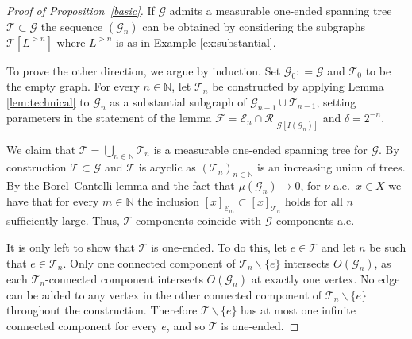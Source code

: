 \documentclass[letterpaper,11pt,reqno]{amsart}
\theoremstyle{bfnote}
\theoremstyle{definition}
\newtheorem{remark}[theorem]{Remark}
\newcommand{\0}{\varnothing}
\numberwithin{equation}{section}
\begin{document}
\begin{proof}[Proof of Proposition~\ref{basic}]
If $\mathcal{G}$ admits a measurable one-ended spanning tree $\mathcal{T} \subset \mathcal{G}$ the sequence $(\mathcal G_n)$ can be obtained by considering the subgraphs $\mathcal T[L^{>n}]$ where $L^{>n}$ is as in Example \ref{ex:substantial}.

To prove the other direction, we argue by induction. Set $\mathcal G_0: = \mathcal G$ and $\mathcal T_0 $ to be the empty graph. For every $n\in \mathbb N$, let $\mathcal T_n$ be constructed by applying Lemma \ref{lem:technical} to $\mathcal G_{n}$ as a substantial subgraph of $\mathcal G_{n-1} \cup \mathcal T_{n-1}$, setting parameters in the statement of the lemma $\mathcal F = \mathcal E_{n} \cap \mathcal{R}|_{\mathcal G[I(\mathcal G_{n})]}$ and $\delta = 2^{-n}$.


We claim that $\mathcal T = \bigcup_{n\in \mathbb N} \mathcal T_n$ is a measurable one-ended spanning tree for $\mathcal G$. By construction $\mathcal T \subset \mathcal G$ and $\mathcal T$ is acyclic as $(\mathcal T_{n})_{n\in \mathbb N}$ is an increasing union of trees. By the Borel--Cantelli lemma and the fact that $\mu (\mathcal G_n) \to 0$, for $\nu$-a.e.\ $x\in X$ we have that for every $m\in \mathbb N$ the inclusion $[x]_{\mathcal E_m} \subset [x]_{\mathcal T_n}$ holds for all $n$ sufficiently large. Thus, $\mathcal T$-components coincide with $\mathcal G$-components a.e. 

It is only left to show that $\mathcal T$ is one-ended. To do this, let $e \in \mathcal T$ and let $n$ be such that $e \in \mathcal T_n$. Only one connected component of $\mathcal T_n \backslash \{e\}$ intersects $O(\mathcal G_n)$, as each $\mathcal T_n$-connected component intersects $O(\mathcal G_n)$ at exactly one vertex. No edge can be added to any vertex in the other connected component of $\mathcal T_n \backslash \{e\}$ throughout the construction. Therefore $\mathcal T \backslash \{e\}$ has  at most one infinite connected component for every $e$, and so $\mathcal T$ is one-ended.
\end{proof}

\end{document}
